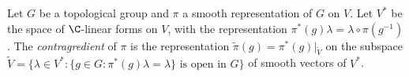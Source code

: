 Let $G$ be a topological group and $\pi$ a smooth representation of $G$ on $V$. Let $V^*$ be the space of
$\C$-linear forms on $V$, with the representation $\pi^*(g)\lambda=\lambda\circ\pi(g^{-1})$. The
\emph{contragredient} of $\pi$ is the representation $\tilde\pi(g)=\pi^*(g)|_{\tilde V}$ on the subspace
$\tilde V=\{\lambda\in V^*:\{g\in G:\pi^*(g)\lambda=\lambda\}\text{ is open in }G\}$ of smooth vectors of $V^*$.
